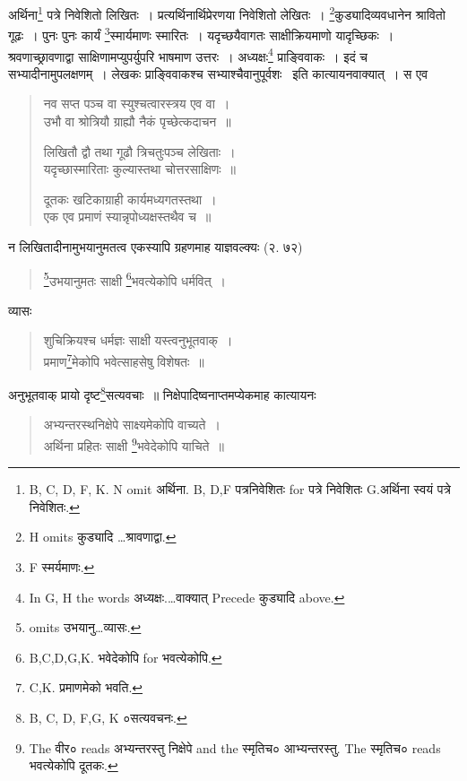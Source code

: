\documentclass[11pt, openany]{book}
\begin{document}
अर्थिना\renewcommand{\thefootnote}{4}\footnote{B, C, D, F, K. N omit अर्थिना. B, D,F पत्रनिवेशितः for पत्रे निवेशितः G.अर्थिना स्वयं पत्रे निवेशितः.} पत्रे निवेशितो लिखितः~। प्रत्यर्थिनार्थिप्रेरणया निवेशितो लेखितः~। \renewcommand{\thefootnote}{5}\footnote{H omits कुड्यादि \ldots श्रावणाद्वा.}कुड्यादिव्यवधानेन श्रावितो गूढः~। पुनः पुनः कार्यं \renewcommand{\thefootnote}{6}\footnote{F स्मर्यमाणः.}स्मार्यमाणः स्मारितः~। यदृच्छयैवागतः साक्षीक्रियमाणो यादृच्छिकः~। श्रवणाच्छ्रावणाद्वा साक्षिणामप्युपर्युपरि भाषमाण उत्तरः~। अध्यक्षः\renewcommand{\thefootnote}{7}\footnote{In G, H the words अध्यक्षः.\ldots वाक्यात् Precede कुड्यादि above.} प्राङ्विवाकः~। इदं च सभ्यादीनामुपलक्षणम्~। लेखकः प्राङ्विवाकश्च सभ्याश्चैवानुपूर्वशः \textendash\ इति कात्यायनवाक्यात्~। स एव

\begin{quote}
{\vy नव सप्त पञ्च वा स्युश्चत्वारस्त्रय एव वा~।\\
उभौ वा श्रोत्रियौ ग्राह्यौ नैकं पृच्छेत्कदाचन~॥

लिखितौ द्वौ तथा गूढौ त्रिचतुःपञ्च लेखिताः~।\\
यदृच्छास्मारिताः कुल्यास्तथा चोत्तरसाक्षिणः~॥

दूतकः खटिकाग्राही कार्यमध्यगतस्तथा~।\\
एक एव प्रमाणं स्यान्नृपोध्यक्षस्तथैव च~॥}
\end{quote}

न लिखितादीनामुभयानुमतत्व एकस्यापि ग्रहणमाह याज्ञवल्क्यः (२. ७२) 

\begin{quote}
{\vy \renewcommand{\thefootnote}{8}\footnote{omits उभयानु\ldots व्यासः.}उभयानुमतः साक्षी \renewcommand{\thefootnote}{9}\footnote{B,C,D,G,K. भवेदेकोपि for भवत्येकोपि.}भवत्येकोपि धर्मवित्~।}
\end{quote}

\newpage
{}

व्यासः

\begin{quote}
{\vy शुचिक्रियश्च धर्मज्ञः साक्षी यस्त्वनुभूतवाक्~।\\
प्रमाण\renewcommand{\thefootnote}{1}\footnote{C,K. प्रमाणमेको भवति.}मेकोपि भवेत्साहसेषु विशेषतः~॥}
\end{quote}

अनुभूतवाक् प्रायो दृष्ट\renewcommand{\thefootnote}{2}\footnote{B, C, D, F,G, K ०सत्यवचनः.}सत्यवचाः~॥ निक्षेपादिष्वनाप्तमप्येकमाह कात्यायनः

\begin{quote}
{\vy अभ्यन्तरस्थनिक्षेपे साक्ष्यमेकोपि वाच्यते~।\\
अर्थिना प्रहितः साक्षी \renewcommand{\thefootnote}{3}\footnote{The वीर० reads अभ्यन्तरस्तु निक्षेपे and the स्मृतिच० {\qt आभ्यन्तरस्तु.} The स्मृतिच० reads भवत्येकोपि दूतकः.}भवेदेकोपि याचिते~॥}
\end{quote}
\end{document}
